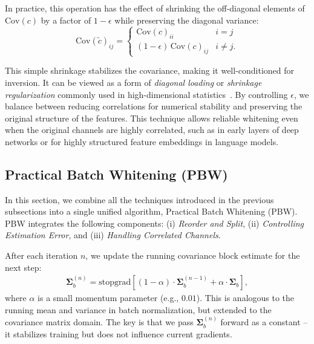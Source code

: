 \noindent In practice, this operation has the effect of shrinking the off-diagonal elements of $\mathrm{Cov}(c)$ by a factor of $1-\epsilon$ while preserving the diagonal variance:
\begin{equation*}
\mathrm{Cov}(\tilde{c})_{ij} = 
\begin{cases} 
\mathrm{Cov}(c)_{ii} & i = j \\
(1-\epsilon)\, \mathrm{Cov}(c)_{ij} & i \neq j.
\end{cases}
\end{equation*}

This simple shrinkage stabilizes the covariance, making it well-conditioned for inversion. 
It can be viewed as a form of \emph{diagonal loading} or \emph{shrinkage regularization} commonly used in high-dimensional statistics~\citep{ledoit2004well,chen2010shrinkage}. 
By controlling $\epsilon$, we balance between reducing correlations for numerical stability and preserving the original structure of the features. 
This technique allows reliable whitening even when the original channels are highly correlated, such as in early layers of deep networks or for highly structured feature embeddings in language models.

%
%
%
%

\subsection{Practical Batch Whitening (PBW)}

In this section, we combine all the techniques introduced in the previous subsections into a single unified algorithm, Practical Batch Whitening (PBW).  
PBW integrates the following components: (i) \emph{Reorder and Split}, (ii) \emph{Controlling Estimation Error}, and (iii) \emph{Handling Correlated Channels}.  

After each iteration $n$, we update the running covariance block estimate for the next step:
\begin{align*}
\boldsymbol{\Sigma}^{(n)}_b = \text{stopgrad} [ (1 - \alpha) \cdot \boldsymbol{\Sigma}^{(n-1)}_b + \alpha \cdot \boldsymbol{\Sigma}_b ],
\end{align*}
where $\alpha$ is a small momentum parameter (e.g., $0.01$).  
This is analogous to the running mean and variance in batch normalization, but extended to the covariance matrix domain.
The key is that we pass $\boldsymbol{\Sigma}^{(n)}_b$ forward as a constant -- it stabilizes training but does not influence current gradients. 

